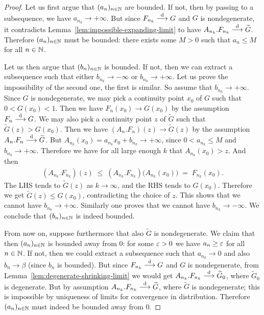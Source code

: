 \begin{proof}
  Let us first argue that $(a_n)_{n \in \mathbb{N}}$ are bounded.
  If not, then by passing to a subsequence, we have $a_{n_k} \to +\infty$.
  But since $F_{n_k} \overset{\mathrm{d}}{\longrightarrow} G$ and $G$ is nondegenerate,
  it contradicts Lemma~\ref{lem:impossible-expanding-limit}
  to have $A_{n_k} . F_{n_k} \overset{\mathrm{d}}{\longrightarrow} \widetilde{G}$.
  Therefore $(a_n)_{n \in \mathbb{N}}$ must be bounded: there exists
  some $M>0$ such that $a_n \le M$ for all $n \in \mathbb{N}$.

  Let us then argue that $(b_n)_{n \in \mathbb{N}}$ is bounded.
  If not, then we can extract a subsequence such
  that either $b_{n_k} \to -\infty$ or $b_{n_k} \to +\infty$.
  Let us prove the impossibility of the second one, the first is similar.
  So assume that $b_{n_k} \to +\infty$.
  Since $G$ is nondegenerate, we may pick a continuity point $x_0$
  of $G$ such that $0 < G(x_0) < 1$. Then we have $F_n(x_0) \to G(x_0)$
  by the assumption $F_n \overset{\mathrm{d}}{\longrightarrow} G$.
  We may also pick a continuity point $z$ of $\widetilde{G}$
  such that $\widetilde{G}(z) > G(x_0)$. Then we have
  $(A_n.F_n)(z) \to \widetilde{G}(z)$
  by the assumption $A_n.F_n \overset{\mathrm{d}}{\longrightarrow} \widetilde{G}$.
  But $A_{n_k}(x_0) = a_{n_k} x_0 + b_{n_k} \to +\infty$, since $0 < a_{n_k} \le M$
  and $b_{n_k} \to +\infty$. Therefore we have for all large enough $k$
  that $A_{n_k}(x_0) > z$. And then
  \begin{align*}
    (A_{n_k}.F_{n_k})(z) \; \le \; (A_{n_k}.F_{n_k})\big(A_{n_k}(x_0)\big) \; = \; F_{n_k}(x_0) .
  \end{align*}
  The LHS tends to $\widetilde{G}(z)$ as $k \to \infty$, and the RHS tends to $G(x_0)$.
  Therefore we get $\widetilde{G}(z) \le G(x_0)$, contradicting the choice of $z$.
  This shows that we cannot have $b_{n_k} \to +\infty$. Similarly one proves that
  we cannot have $b_{n_k} \to -\infty$. We conclude that $(b_n)_{n \in \mathbb{N}}$
  is indeed bounded.

  From now on, suppose furthermore that also $\widetilde{G}$ is nondegenerate.
  We claim that then $(a_n)_{n \in \mathbb{N}}$ is bounded away from $0$:
  for some $\varepsilon > 0$ we have $a_n \ge \varepsilon$ for all $n \in \mathbb{N}$.
  If not, then we could extract a subsequence such that $a_{n_k} \to 0$
  and also $b_n \to \beta$ (since $b_n$ is bounded).
  But since $F_{n_k} \overset{\mathrm{d}}{\longrightarrow} G$ and $G$ is nondegenerate,
  from Lemma~\ref{lem:degenerate-shrinking-limit}
  we would get $A_{n_k} . F_{n_k} \overset{\mathrm{d}}{\longrightarrow} \widetilde{G}_0$,
  where $\widetilde{G}_0$ is degenerate. But by assumption
  $A_{n_k} . F_{n_k} \overset{\mathrm{d}}{\longrightarrow} \widetilde{G}$, where
  $\widetilde{G}$ is nondegenerate; this is impossible by uniqueness
  of limits for convergence in distribution. Therefore
  $(a_n)_{n \in \mathbb{N}}$ must indeed be bounded away from $0$.


\end{proof}
